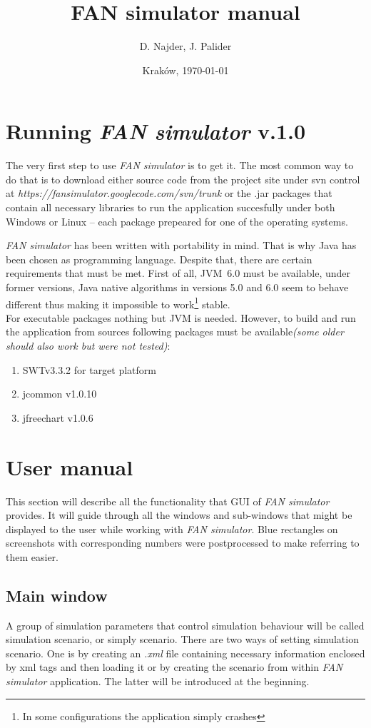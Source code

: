 \documentclass[a4paper,12pt]{article}
\title{FAN simulator manual}
\author{D. Najder, J. Palider}
\date{Krak\'ow, \today}
\begin{document}
	\maketitle
	
	\newpage
		
	\section{Running \emph{FAN simulator} v.1.0}
	
	The very first step to use \emph{FAN simulator} is to get it. The most common
	way to do that is to download either source code from the project site under
	svn control at \emph{https://fansimulator.googlecode.com/svn/trunk} or the
	.jar packages that contain all necessary libraries to run the application
	succesfully under both Windows or Linux -- each package prepeared for one of
	the operating systems.	
	
	\emph{FAN simulator} has been written with portability in mind. That is why
	Java has been chosen as programming language. Despite that, there are certain
	requirements that must be met. First of all, JVM~6.0 must be available, under
	former versions, Java native algorithms in versions 5.0 and 6.0 seem to behave
	different thus making it impossible to work\footnote{In some configurations
	the application simply crashes} stable.\\
	For executable packages nothing but JVM is needed. However, to build and run
	the application from sources following packages must be available\emph{(some
	older should also work but were not tested)}:
	\begin{enumerate}
	\item {SWTv3.3.2 for target platform}
	\item {jcommon v1.0.10}
	\item {jfreechart v1.0.6}
	\end{enumerate}
	
	
	\section{User manual}
	This section will describe all the functionality that GUI of \emph{FAN
	simulator} provides. It will guide through all the windows and sub-windows
	that might be displayed to the user while working with \emph{FAN simulator}.
	Blue rectangles on screenshots with corresponding numbers were postprocessed
	to make referring to them easier.
	
	\subsection{Main window}
	A group of simulation parameters that control simulation behaviour will be
	called simulation scenario, or simply scenario. There are two ways of setting
	simulation scenario. One is by creating an \emph{.xml} file containing
	necessary information enclosed by xml tags and then loading it or by creating
	the scenario from within \emph{FAN simulator} application. The latter will be
	introduced at the beginning.
\end{document}
